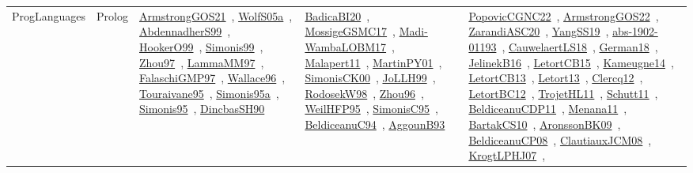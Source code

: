 {\begin{longtable}{lp{3cm}>{\raggedright\arraybackslash}p{6cm}>{\raggedright\arraybackslash}p{6cm}>{\raggedright\arraybackslash}p{8cm}}
\index{Prolog}\index{ProgLanguages!Prolog}ProgLanguages & Prolog & \href{../works/ArmstrongGOS21.pdf}{ArmstrongGOS21}~\cite{ArmstrongGOS21}, \href{../works/WolfS05a.pdf}{WolfS05a}~\cite{WolfS05a}, \href{../works/AbdennadherS99.pdf}{AbdennadherS99}~\cite{AbdennadherS99}, \href{../works/HookerO99.pdf}{HookerO99}~\cite{HookerO99}, \href{../works/Simonis99.pdf}{Simonis99}~\cite{Simonis99}, \href{../works/Zhou97.pdf}{Zhou97}~\cite{Zhou97}, \href{../works/LammaMM97.pdf}{LammaMM97}~\cite{LammaMM97}, \href{../works/FalaschiGMP97.pdf}{FalaschiGMP97}~\cite{FalaschiGMP97}, \href{../works/Wallace96.pdf}{Wallace96}~\cite{Wallace96}, \href{../works/Touraivane95.pdf}{Touraivane95}~\cite{Touraivane95}, \href{../works/Simonis95a.pdf}{Simonis95a}~\cite{Simonis95a}, \href{../works/Simonis95.pdf}{Simonis95}~\cite{Simonis95}, \href{../works/DincbasSH90.pdf}{DincbasSH90}~\cite{DincbasSH90} & \href{../works/BadicaBI20.pdf}{BadicaBI20}~\cite{BadicaBI20}, \href{../works/MossigeGSMC17.pdf}{MossigeGSMC17}~\cite{MossigeGSMC17}, \href{../works/Madi-WambaLOBM17.pdf}{Madi-WambaLOBM17}~\cite{Madi-WambaLOBM17}, \href{../works/Malapert11.pdf}{Malapert11}~\cite{Malapert11}, \href{../works/MartinPY01.pdf}{MartinPY01}~\cite{MartinPY01}, \href{../works/SimonisCK00.pdf}{SimonisCK00}~\cite{SimonisCK00}, \href{../works/JoLLH99.pdf}{JoLLH99}~\cite{JoLLH99}, \href{../works/RodosekW98.pdf}{RodosekW98}~\cite{RodosekW98}, \href{../works/Zhou96.pdf}{Zhou96}~\cite{Zhou96}, \href{../works/WeilHFP95.pdf}{WeilHFP95}~\cite{WeilHFP95}, \href{../works/SimonisC95.pdf}{SimonisC95}~\cite{SimonisC95}, \href{../works/BeldiceanuC94.pdf}{BeldiceanuC94}~\cite{BeldiceanuC94}, \href{../works/AggounB93.pdf}{AggounB93}~\cite{AggounB93} & \href{../works/PopovicCGNC22.pdf}{PopovicCGNC22}~\cite{PopovicCGNC22}, \href{../works/ArmstrongGOS22.pdf}{ArmstrongGOS22}~\cite{ArmstrongGOS22}, \href{../works/ZarandiASC20.pdf}{ZarandiASC20}~\cite{ZarandiASC20}, \href{../works/YangSS19.pdf}{YangSS19}~\cite{YangSS19}, \href{../works/abs-1902-01193.pdf}{abs-1902-01193}~\cite{abs-1902-01193}, \href{../works/CauwelaertLS18.pdf}{CauwelaertLS18}~\cite{CauwelaertLS18}, \href{../works/German18.pdf}{German18}~\cite{German18}, \href{../works/JelinekB16.pdf}{JelinekB16}~\cite{JelinekB16}, \href{../works/LetortCB15.pdf}{LetortCB15}~\cite{LetortCB15}, \href{../works/Kameugne14.pdf}{Kameugne14}~\cite{Kameugne14}, \href{../works/LetortCB13.pdf}{LetortCB13}~\cite{LetortCB13}, \href{../works/Letort13.pdf}{Letort13}~\cite{Letort13}, \href{../works/Clercq12.pdf}{Clercq12}~\cite{Clercq12}, \href{../works/LetortBC12.pdf}{LetortBC12}~\cite{LetortBC12}, \href{../works/TrojetHL11.pdf}{TrojetHL11}~\cite{TrojetHL11}, \href{../works/Schutt11.pdf}{Schutt11}~\cite{Schutt11}, \href{../works/BeldiceanuCDP11.pdf}{BeldiceanuCDP11}~\cite{BeldiceanuCDP11}, \href{../works/Menana11.pdf}{Menana11}~\cite{Menana11}, \href{../works/BartakCS10.pdf}{BartakCS10}~\cite{BartakCS10}, \href{../works/AronssonBK09.pdf}{AronssonBK09}~\cite{AronssonBK09}, \href{../works/BeldiceanuCP08.pdf}{BeldiceanuCP08}~\cite{BeldiceanuCP08}, \href{../works/ClautiauxJCM08.pdf}{ClautiauxJCM08}~\cite{ClautiauxJCM08}, \href{../works/KrogtLPHJ07.pdf}{KrogtLPHJ07}~\cite{KrogtLPHJ07}, 
\end{longtable}}
